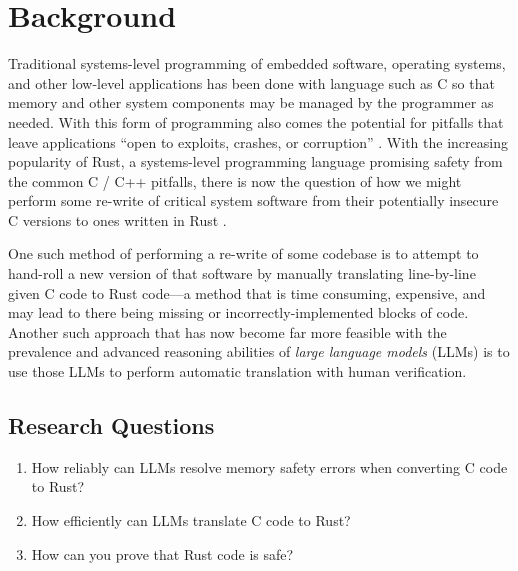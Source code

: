 \documentclass[conference]{IEEEtran}
\begin{document}
\section{Background}
Traditional systems-level programming of embedded software, operating systems,
and other low-level applications has been done with language such as C so that
memory and other system components may be managed by the programmer as needed.
With this form of programming also comes the potential for pitfalls that leave
applications ``open to exploits, crashes, or corruption'' 
\cite{klabnik2018rust_book}. With the increasing popularity of Rust, a
systems-level programming language promising safety from the common C / C++
pitfalls, there is now the question of how we might perform some re-write of
critical system software from their potentially insecure C versions to ones
written in Rust \cite{klabnik2018rust_book, emre2021translating}.

One such method of performing a re-write of some codebase is to attempt to
hand-roll a new version of that software by manually translating line-by-line
given C code to Rust code---a method that is time consuming, expensive, and
may lead to there being missing or incorrectly-implemented blocks of code.
Another such approach that has now become far more feasible with the
prevalence and advanced reasoning abilities of \textit{large language models}
(LLMs) is to use those LLMs to perform automatic translation with human
verification.

\subsection{Research Questions}
\begin{enumerate}
    \item How reliably can LLMs resolve memory safety errors when converting 
        C code to Rust?
    \item How efficiently can LLMs translate C code to Rust?
    \item How can you prove that Rust code is safe?
\end{enumerate}
\end{document}
